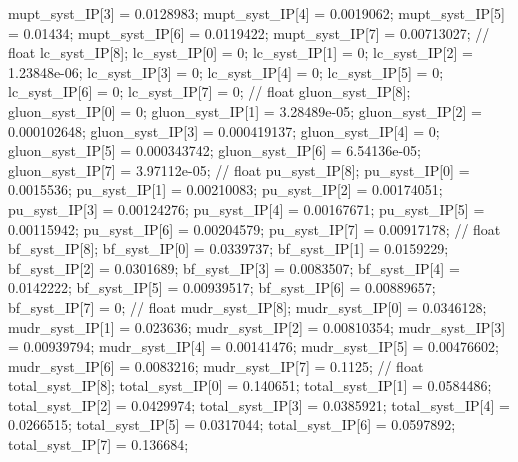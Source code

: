 mupt_syst_IP[3] = 0.0128983; mupt_syst_IP[4] = 0.0019062; mupt_syst_IP[5] = 0.01434; 
mupt_syst_IP[6] = 0.0119422; mupt_syst_IP[7] = 0.00713027; 
// float lc_syst_IP[8];
lc_syst_IP[0] = 0; lc_syst_IP[1] = 0; lc_syst_IP[2] = 1.23848e-06; 
lc_syst_IP[3] = 0; lc_syst_IP[4] = 0; lc_syst_IP[5] = 0; 
lc_syst_IP[6] = 0; lc_syst_IP[7] = 0; 
// float gluon_syst_IP[8];
gluon_syst_IP[0] = 0; gluon_syst_IP[1] = 3.28489e-05; gluon_syst_IP[2] = 0.000102648; 
gluon_syst_IP[3] = 0.000419137; gluon_syst_IP[4] = 0; gluon_syst_IP[5] = 0.000343742; 
gluon_syst_IP[6] = 6.54136e-05; gluon_syst_IP[7] = 3.97112e-05; 
// float pu_syst_IP[8];
pu_syst_IP[0] = 0.0015536; pu_syst_IP[1] = 0.00210083; pu_syst_IP[2] = 0.00174051; 
pu_syst_IP[3] = 0.00124276; pu_syst_IP[4] = 0.00167671; pu_syst_IP[5] = 0.00115942; 
pu_syst_IP[6] = 0.00204579; pu_syst_IP[7] = 0.00917178; 
// float bf_syst_IP[8];
bf_syst_IP[0] = 0.0339737; bf_syst_IP[1] = 0.0159229; bf_syst_IP[2] = 0.0301689; 
bf_syst_IP[3] = 0.0083507; bf_syst_IP[4] = 0.0142222; bf_syst_IP[5] = 0.00939517; 
bf_syst_IP[6] = 0.00889657; bf_syst_IP[7] = 0; 
// float mudr_syst_IP[8];
mudr_syst_IP[0] = 0.0346128; mudr_syst_IP[1] = 0.023636; mudr_syst_IP[2] = 0.00810354; 
mudr_syst_IP[3] = 0.00939794; mudr_syst_IP[4] = 0.00141476; mudr_syst_IP[5] = 0.00476602; 
mudr_syst_IP[6] = 0.0083216; mudr_syst_IP[7] = 0.1125; 
// float total_syst_IP[8];
total_syst_IP[0] = 0.140651; total_syst_IP[1] = 0.0584486; total_syst_IP[2] = 0.0429974; 
total_syst_IP[3] = 0.0385921; total_syst_IP[4] = 0.0266515; total_syst_IP[5] = 0.0317044; 
total_syst_IP[6] = 0.0597892; total_syst_IP[7] = 0.136684; 



